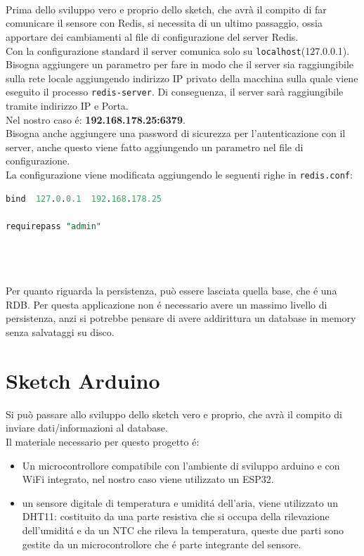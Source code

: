 \\
\\
\\
Prima dello sviluppo vero e proprio dello sketch, che avrà il compito di far comunicare il sensore con Redis,
si necessita di un ultimo passaggio, ossia apportare dei cambiamenti al file di configurazione del server Redis.
\\
Con la configurazione standard il server comunica solo su \texttt{localhost}(127.0.0.1).
Bisogna aggiungere un parametro per fare in modo che il server sia raggiungibile sulla rete locale aggiungendo indirizzo IP
privato della macchina sulla quale viene eseguito il processo \texttt{redis-server}.
Di conseguenza, il server sarà raggiungibile tramite indirizzo IP e Porta.\\
Nel nostro caso é: \textbf{192.168.178.25:6379}.\\
Bisogna anche aggiungere una password di sicurezza per l'autenticazione con il server, anche questo viene fatto
aggiungendo un parametro nel file di configurazione.
\\
La configurazione viene modificata aggiungendo le seguenti righe in \texttt{redis.conf}:
\begin{lstlisting}[autogobble, style=redis-cli, language=SQL]
bind  127.0.0.1  192.168.178.25

requirepass "admin"\end{lstlisting}
\\
\\
\\
Per quanto riguarda la persistenza, può essere lasciata quella base, che é una RDB.
Per questa applicazione non é necessario avere un massimo livello di persistenza, anzi si potrebbe pensare
di avere addirittura un database in memory senza salvataggi su disco.

\section{Sketch Arduino}
Si può passare allo sviluppo dello sketch vero e proprio, che avrà il compito
di inviare dati/informazioni al database.\\
Il materiale necessario per questo progetto é:
\begin{itemize}
    \item Un microcontrollore compatibile con l'ambiente di sviluppo arduino e con WiFi integrato,
          nel nostro caso viene utilizzato un ESP32.
    \item un sensore digitale di temperatura e umiditá dell'aria, viene utilizzato un DHT11: costituito da una parte resistiva
    che si occupa della rilevazione dell'umiditá e da un NTC che rileva la temperatura, queste due parti sono gestite
    da un microcontrollore che é parte integrante del sensore.
\end{itemize}

